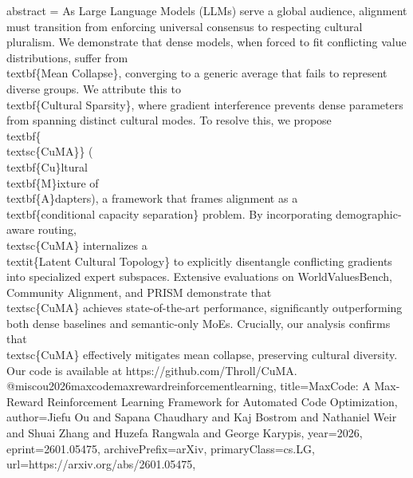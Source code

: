{      abstract = {As Large Language Models (LLMs) serve a global audience, alignment must transition from enforcing universal consensus to respecting cultural pluralism. We demonstrate that dense models, when forced to fit conflicting value distributions, suffer from \\textbf\{Mean Collapse\}, converging to a generic average that fails to represent diverse groups. We attribute this to \\textbf\{Cultural Sparsity\}, where gradient interference prevents dense parameters from spanning distinct cultural modes. To resolve this, we propose \\textbf\{\\textsc\{CuMA\}\} (\\textbf\{Cu\}ltural \\textbf\{M\}ixture of \\textbf\{A\}dapters), a framework that frames alignment as a \\textbf\{conditional capacity separation\} problem. By incorporating demographic-aware routing, \\textsc\{CuMA\} internalizes a \\textit\{Latent Cultural Topology\} to explicitly disentangle conflicting gradients into specialized expert subspaces. Extensive evaluations on WorldValuesBench, Community Alignment, and PRISM demonstrate that \\textsc\{CuMA\} achieves state-of-the-art performance, significantly outperforming both dense baselines and semantic-only MoEs. Crucially, our analysis confirms that \\textsc\{CuMA\} effectively mitigates mean collapse, preserving cultural diversity. Our code is available at https://github.com/Throll/CuMA.}
}@misc{ou2026maxcodemaxrewardreinforcementlearning,
      title={MaxCode: A Max-Reward Reinforcement Learning Framework for Automated Code Optimization}, 
      author={Jiefu Ou and Sapana Chaudhary and Kaj Bostrom and Nathaniel Weir and Shuai Zhang and Huzefa Rangwala and George Karypis},
      year={2026},
      eprint={2601.05475},
      archivePrefix={arXiv},
      primaryClass={cs.LG},
      url={https://arxiv.org/abs/2601.05475},
}
